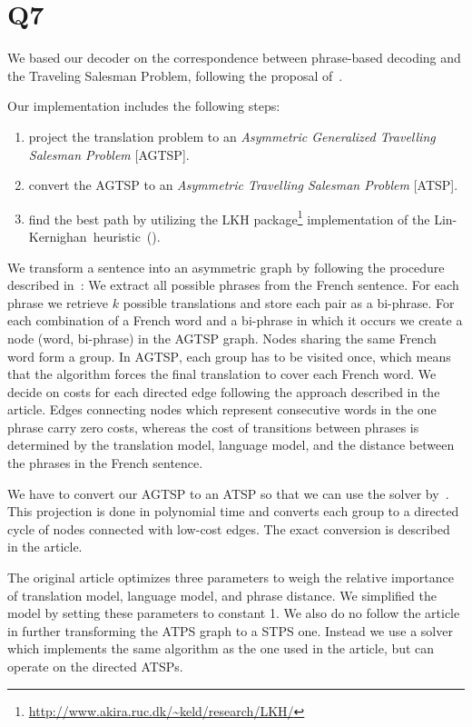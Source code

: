 \section*{Q7}

We based our decoder on the correspondence between phrase-based decoding and
the Traveling Salesman Problem, following the proposal
of~\cite{zaslavskiy2009}.

Our implementation includes the following steps:
\begin{enumerate}
    \item project the translation problem to an \emph{Asymmetric Generalized
        Travelling Salesman Problem} [\textsc{AGTSP}].
    \item convert the \textsc{AGTSP} to an \emph{Asymmetric Travelling
        Salesman Problem} [\textsc{ATSP}].
    \item find the best path by utilizing the LKH
        package\footnote{\url{http://www.akira.ruc.dk/~keld/research/LKH/}}
        implementation of the Lin-Kernighan~heuristic~(\cite{Helsgaun2006}).
\end{enumerate}

We transform a sentence into an asymmetric graph by following the procedure
described in~\cite{zaslavskiy2009}: We extract all possible phrases from the
French sentence. For each phrase we retrieve $k$ possible translations and
store each pair as a bi-phrase. For each combination of a French word and a
bi-phrase in which it occurs we create a node (word, bi-phrase) in the
\textsc{AGTSP} graph. Nodes sharing the same French word form a group. In
\textsc{AGTSP}, each group has to be visited once, which means that the
algorithm forces the final translation to cover each French word.
We decide on costs for each directed edge following the approach described in the
article. Edges connecting nodes which represent consecutive words in the one phrase 
carry zero costs, whereas the cost of transitions between phrases is determined by
the translation model, language model, and the distance between the phrases in
the French sentence.

We have to convert our \textsc{AGTSP} to an \textsc{ATSP} so that we can use
the solver by~\cite{Helsgaun2006}. This projection is done in polynomial
time and converts each group to a directed cycle of nodes connected with low-cost
edges. The exact conversion is described in the article.

The original article optimizes three parameters to weigh the relative
importance of translation model, language model, and phrase distance.
We simplified the model by setting these parameters to constant 1. We also
do no follow the article in further transforming the ATPS graph to a STPS one.
Instead we use a solver which implements the same algorithm as the one used 
in the article, but can operate on the directed \textsc{ATSP}s.

